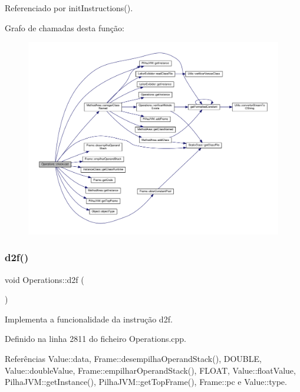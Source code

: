 Referenciado por init\+Instructions().

Grafo de chamadas desta função\+:
\nopagebreak
\begin{figure}[H]
\begin{center}
\leavevmode
\includegraphics[width=350pt]{classOperations_aa4f0f3c8617af197e4a4e2dc62cb9c35_cgraph}
\end{center}
\end{figure}
\mbox{\label{classOperations_ab5a2d770d297ace1ec0e40d3fed9f0e3}} 
\subsubsection{\texorpdfstring{d2f()}{d2f()}}
{\footnotesize\ttfamily void Operations\+::d2f (\begin{DoxyParamCaption}{ }\end{DoxyParamCaption})\hspace{0.3cm}{\ttfamily [private]}}



Implementa a funcionalidade da instrução d2f. 



Definido na linha 2811 do ficheiro Operations.\+cpp.



Referências Value\+::data, Frame\+::desempilha\+Operand\+Stack(), D\+O\+U\+B\+LE, Value\+::double\+Value, Frame\+::empilhar\+Operand\+Stack(), F\+L\+O\+AT, Value\+::float\+Value, Pilha\+J\+V\+M\+::get\+Instance(), Pilha\+J\+V\+M\+::get\+Top\+Frame(), Frame\+::pc e Value\+::type.



